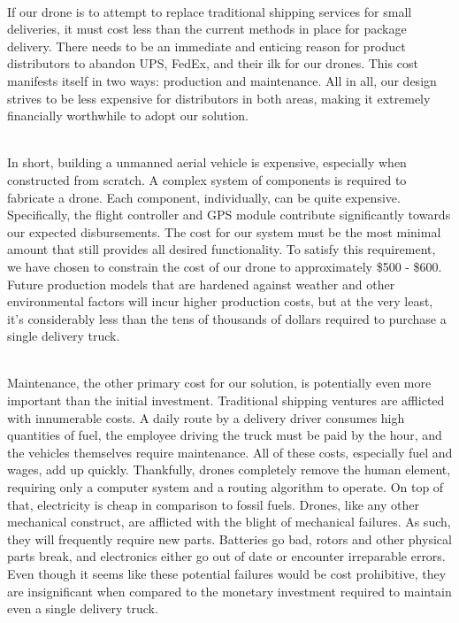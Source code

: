 \documentclass[12pt]{extarticle}
\begin{document}
\ \\
If our drone is to attempt to replace traditional shipping services for small deliveries, it must cost less than the current methods in place for package delivery.  There needs to be an immediate and enticing reason for product distributors to abandon UPS, FedEx, and their ilk for our drones.  This cost manifests itself in two ways: production and maintenance.  All in all, our design strives to be less expensive for distributors in both areas, making it extremely financially worthwhile to adopt our solution.  

\ \\
In short, building a unmanned aerial vehicle is expensive, especially when constructed from scratch.  A complex system of components is required to fabricate a drone.  Each component, individually, can be quite expensive.  Specifically, the flight controller and GPS module contribute significantly towards our expected disbursements.  The cost for our system must be the most minimal amount that still provides all desired functionality.  To satisfy this requirement, we have chosen to constrain the cost of our drone to approximately \$500 - \$600.  Future production models that are hardened against weather and other environmental factors will incur higher production costs, but at the very least, it's considerably less than the tens of thousands of dollars required to purchase a single delivery truck.  

\ \\
Maintenance, the other primary cost for our solution, is potentially even more important than the initial investment.  Traditional shipping ventures are afflicted with innumerable costs.  A daily route by a delivery driver consumes high quantities of fuel, the employee driving the truck must be paid by the hour, and the vehicles themselves require maintenance.  All of these costs, especially fuel and wages, add up quickly.  Thankfully, drones completely remove the human element, requiring only a computer system and a routing algorithm to operate.  On top of that, electricity is cheap in comparison to fossil fuels.  Drones, like any other mechanical construct, are afflicted with the blight of mechanical failures.  As such, they will frequently require new parts.  Batteries go bad, rotors and other physical parts break, and electronics either go out of date or encounter irreparable errors.  Even though it seems like these potential failures would be cost prohibitive, they are insignificant when compared to the monetary investment required to maintain even a single delivery truck.  
\end{document}
